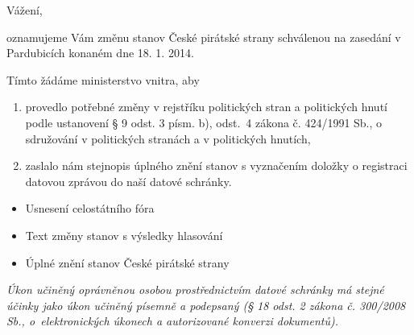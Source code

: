 \documentclass[11pt,a4paper,czech]{article}
\begin{document}

\def \yoursign {č. j. MV-39553-7/VS-2009}
\def \yourdate {}
\def \oursign {RP 2/2014}
\def \place {Praha}

\vspace*{0.5cm}
\printheader

\subject{Změna stanov}

Vážení,

oznamujeme Vám změnu stanov České pirátské strany schválenou na zasedání v Pardubicích konaném dne 18. 1. 2014.

Tímto žádáme ministerstvo vnitra, aby 
\begin{enumerate}
\item provedlo potřebné změny v rejstříku politických stran a politických hnutí podle ustanovení § 9 odst. 3 písm. b), odst.~4 zákona č. 424/1991 Sb., o sdružování v politických stranách a v politických hnutích,
\item zaslalo nám stejnopis úplného znění stanov s vyznačením doložky o registraci datovou zprávou do naší datové schránky.
\end{enumerate}

\signature{S úctou 

\bigskip
PhDr. Ivan Bartoš, Ph. D. \\ předseda Pirátů}

\attachments
\begin{itemize}
\item Usnesení celostátního fóra
\item Text změny stanov s výsledky hlasování
\item Úplné znění stanov České pirátské strany
\end{itemize}

\bigskip
\emph{Úkon učiněný oprávněnou osobou prostřednictvím datové schránky má stejné účinky jako úkon učiněný písemně a podepsaný (§ 18 odst. 2 zákona č. 300/2008 Sb., o~elektronických úkonech a autorizované konverzi dokumentů).}
\end{document}
